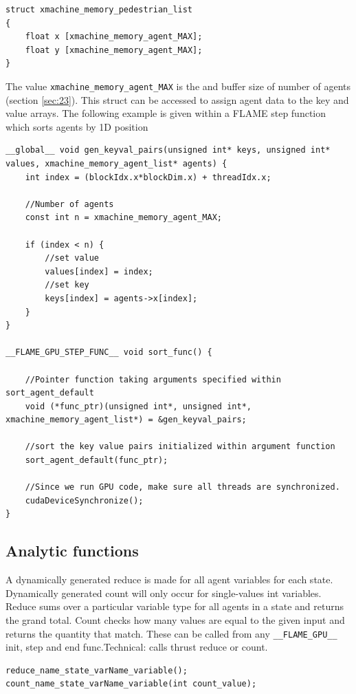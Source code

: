 \documentclass[11pt, a4paper, onecolumn, oneside]{report}
\begin{document}
\begin{verbatim}
struct xmachine_memory_pedestrian_list 
{	
    float x [xmachine_memory_agent_MAX];
    float y [xmachine_memory_agent_MAX];
}
\end{verbatim}

The value \texttt{xmachine_memory_agent_MAX} is the and buffer size of number of agents (section \ref{sec:23}). This struct can be accessed to assign agent data to the key and value arrays. The following example is given within a FLAME step function which sorts agents by 1D position

\begin{verbatim}
__global__ void gen_keyval_pairs(unsigned int* keys, unsigned int* values, xmachine_memory_agent_list* agents) {
	int index = (blockIdx.x*blockDim.x) + threadIdx.x;

	//Number of agents
	const int n = xmachine_memory_agent_MAX;

	if (index < n) {
		//set value
		values[index] = index;
		//set key
		keys[index] = agents->x[index];
	}
}

__FLAME_GPU_STEP_FUNC__ void sort_func() {
	
	//Pointer function taking arguments specified within sort_agent_default
	void (*func_ptr)(unsigned int*, unsigned int*, xmachine_memory_agent_list*) = &gen_keyval_pairs;
    
	//sort the key value pairs initialized within argument function
	sort_agent_default(func_ptr);
	
    //Since we run GPU code, make sure all threads are synchronized.
	cudaDeviceSynchronize();
}
\end{verbatim}

\subsection{Analytic functions}
A dynamically generated reduce is made for all agent variables for each state. Dynamically generated count will only occur for single-values int variables. Reduce sums over a particular variable type for all agents in a state and returns the grand total. Count checks how many values are equal to the given input and returns the quantity that match. These can be called from any \texttt{__FLAME_GPU__} init, step and end func.Technical: calls thrust reduce or count. 

\begin{verbatim}
reduce_name_state_varName_variable();
count_name_state_varName_variable(int count_value);
\end{verbatim}
\end{document}
